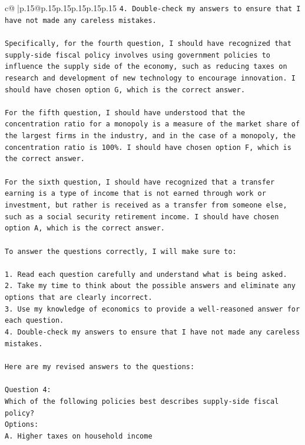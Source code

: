 \documentclass{article}
\begin{document}
{\begin{supertabular}{c@{$\;$}|p{.15\linewidth}@{}p{.15\linewidth}p{.15\linewidth}p{.15\linewidth}p{.15\linewidth}p{.15\linewidth}}
{{{\texttt{4. Double{-}check my answers to ensure that I have not made any careless mistakes.} \\
\\ 
\texttt{Specifically, for the fourth question, I should have recognized that supply{-}side fiscal policy involves using government policies to influence the supply side of the economy, such as reducing taxes on research and development of new technology to encourage innovation. I should have chosen option G, which is the correct answer.} \\
\\ 
\texttt{For the fifth question, I should have understood that the concentration ratio for a monopoly is a measure of the market share of the largest firms in the industry, and in the case of a monopoly, the concentration ratio is 100\%. I should have chosen option F, which is the correct answer.} \\
\\ 
\texttt{For the sixth question, I should have recognized that a transfer earning is a type of income that is not earned through work or investment, but rather is received as a transfer from someone else, such as a social security retirement income. I should have chosen option A, which is the correct answer.} \\
\\ 
\texttt{To answer the questions correctly, I will make sure to:} \\
\\ 
\texttt{1. Read each question carefully and understand what is being asked.} \\
\texttt{2. Take my time to think about the possible answers and eliminate any options that are clearly incorrect.} \\
\texttt{3. Use my knowledge of economics to provide a well{-}reasoned answer for each question.} \\
\texttt{4. Double{-}check my answers to ensure that I have not made any careless mistakes.} \\
\\ 
\texttt{Here are my revised answers to the questions:} \\
\\ 
\texttt{Question 4:} \\
\texttt{Which of the following policies best describes supply{-}side fiscal policy?} \\
\texttt{Options:} \\
\texttt{A. Higher taxes on household income} \\
}}}
\end{supertabular}}
\end{document}
